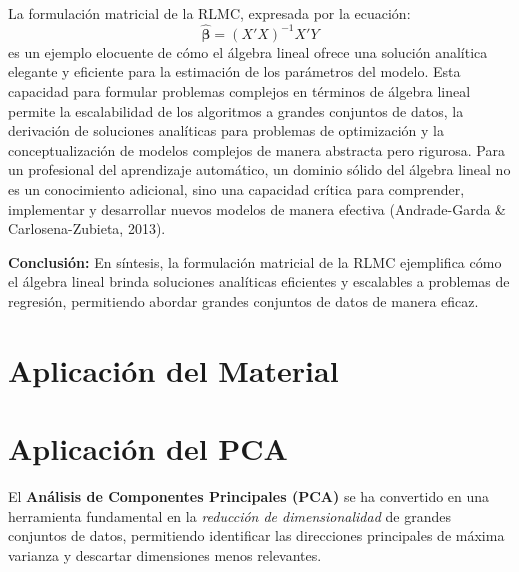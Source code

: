\documentclass[12pt]{article}
\begin{document}
        La formulación matricial de la RLMC, expresada por la ecuación:
        \[
        \hat{\bm{\beta}} = (X'X)^{-1} X'Y
        \]
        es un ejemplo elocuente de cómo el álgebra lineal ofrece una solución analítica elegante y eficiente para la estimación de los parámetros del modelo. Esta capacidad para formular problemas complejos en términos de álgebra lineal permite la escalabilidad de los algoritmos a grandes conjuntos de datos, la derivación de soluciones analíticas para problemas de optimización y la conceptualización de modelos complejos de manera abstracta pero rigurosa. Para un profesional del aprendizaje automático, un dominio sólido del álgebra lineal no es un conocimiento adicional, sino una capacidad crítica para comprender, implementar y desarrollar nuevos modelos de manera efectiva (Andrade-Garda \& Carlosena-Zubieta, 2013).
        
        \noindent
        \textbf{Conclusión:} En síntesis, la formulación matricial de la RLMC ejemplifica cómo el álgebra lineal brinda soluciones analíticas eficientes y escalables a problemas de regresión, permitiendo abordar grandes conjuntos de datos de manera eficaz.
        
        \newpage
        \section{Aplicación del Material}
        \section*{Aplicación del PCA}
        \noindent
        El \textbf{Análisis de Componentes Principales (PCA)} se ha convertido en una herramienta fundamental en la \emph{reducción de dimensionalidad} de grandes conjuntos de datos, permitiendo identificar las direcciones principales de máxima varianza y descartar dimensiones menos relevantes.
        
\end{document}
